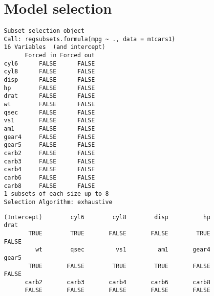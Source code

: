 \documentclass[12pt,letterpaperpaper,openany]{book}
\newenvironment{Shaded}{\begin{snugshade}}{\end{snugshade}}
\newcommand{\CommentTok}[1]{\textcolor[rgb]{0.56,0.35,0.01}{\textit{#1}}}
\newcommand{\DataTypeTok}[1]{\textcolor[rgb]{0.13,0.29,0.53}{#1}}
\newcommand{\KeywordTok}[1]{\textcolor[rgb]{0.13,0.29,0.53}{\textbf{#1}}}
\newcommand{\NormalTok}[1]{#1}
\newcommand{\OperatorTok}[1]{\textcolor[rgb]{0.81,0.36,0.00}{\textbf{#1}}}
\newcommand{\StringTok}[1]{\textcolor[rgb]{0.31,0.60,0.02}{#1}}
\begin{document}
\hypertarget{model-selection}{%
\section{Model selection}\label{model-selection}}

\begin{Shaded}
\end{Shaded}

\begin{verbatim}
Subset selection object
Call: regsubsets.formula(mpg ~ ., data = mtcars1)
16 Variables  (and intercept)
      Forced in Forced out
cyl6      FALSE      FALSE
cyl8      FALSE      FALSE
disp      FALSE      FALSE
hp        FALSE      FALSE
drat      FALSE      FALSE
wt        FALSE      FALSE
qsec      FALSE      FALSE
vs1       FALSE      FALSE
am1       FALSE      FALSE
gear4     FALSE      FALSE
gear5     FALSE      FALSE
carb2     FALSE      FALSE
carb3     FALSE      FALSE
carb4     FALSE      FALSE
carb6     FALSE      FALSE
carb8     FALSE      FALSE
1 subsets of each size up to 8
Selection Algorithm: exhaustive
\end{verbatim}

\begin{Shaded}
\end{Shaded}

\begin{verbatim}
(Intercept)        cyl6        cyl8        disp          hp        drat 
       TRUE        TRUE       FALSE       FALSE        TRUE       FALSE 
         wt        qsec         vs1         am1       gear4       gear5 
       TRUE       FALSE        TRUE        TRUE       FALSE       FALSE 
      carb2       carb3       carb4       carb6       carb8 
      FALSE       FALSE       FALSE       FALSE       FALSE 
\end{verbatim}
\end{document}
